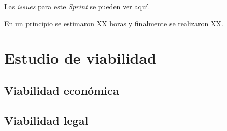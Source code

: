 Las \emph{issues} para este \emph{Sprint} se pueden ver \href{https://github.com/psnti/TFG-Pablo-Santidrian-Tudanca/milestone/9}{aquí}.


En un principio se estimaron XX horas y finalmente se realizaron XX.

\section{Estudio de viabilidad}

\subsection{Viabilidad económica}

\subsection{Viabilidad legal}


